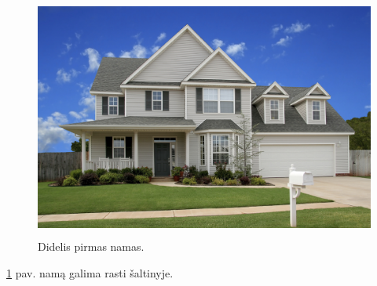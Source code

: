 \documentclass[12pt]{article}
\begin{document}
\begin{figure}[!htbp]
\centering
	\includegraphics[height=8cm]{house1}
	\caption{Didelis pirmas namas.}
	\label{fig:2}
\end{figure}

\ref{fig:2} pav. namą galima rasti \cite{namas} šaltinyje.

\newpage

\end{document}
